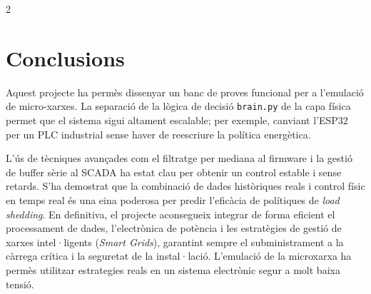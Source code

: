 \documentclass[11pt,a4paper]{article}
\begin{document}
\begin{multicols}{2}
    \section{Conclusions}
    Aquest projecte ha permès dissenyar un banc de proves funcional per a l'emulació de micro-xarxes. La separació de la lògica de decisió \texttt{brain.py} de la capa física permet que el sistema sigui altament escalable; per exemple, canviant l'ESP32 per un PLC industrial sense haver de reescriure la política energètica.

    L'ús de tècniques avançades com el filtratge per mediana al firmware i la gestió de buffer sèrie al SCADA ha estat clau per obtenir un control estable i sense retards. S'ha demostrat que la combinació de dades històriques reals i control físic en temps real és una eina poderosa per predir l'eficàcia de polítiques de \textit{load shedding}. En definitiva, el projecte aconsegueix integrar de forma eficient el processament de dades, l'electrònica de potència i les estratègies de gestió de xarxes intel·ligents (\textit{Smart Grids}), garantint sempre el subministrament a la càrrega crítica i la seguretat de la instal·lació. L'emulació de la microxarxa ha permès utilitzar estrategies reals en un sistema electrònic segur a molt baixa tensió.

\end{multicols}
\end{document}
